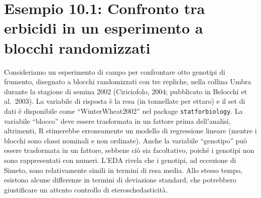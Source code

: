 \documentclass[
  12pt,
]{book}
\begin{document}
\hypertarget{esempio-10.1-confronto-tra-erbicidi-in-un-esperimento-a-blocchi-randomizzati}{%
\section{Esempio 10.1: Confronto tra erbicidi in un esperimento a blocchi randomizzati}\label{esempio-10.1-confronto-tra-erbicidi-in-un-esperimento-a-blocchi-randomizzati}}

Consideriamo un esperimento di campo per confrontare otto genotipi di frumento, disegnato a blocchi randomizzati con tre repliche, nella collina Umbra durante la stagione di semina 2002 (Ciriciofolo, 2004; pubblicato in Belocchi et al.~2003). La variabile di risposta è la resa (in tonnellate per ettaro) e il set di dati è disponibile come ``WinterWheat2002'' nel package \texttt{statforbiology}. La variabile ``blocco'' deve essere trasformata in un fattore prima dell'analisi, altrimenti, R stimerebbe erroneamente un modello di regressione lineare (mentre i blocchi sono classi nominali e non ordinate). Anche la variabile ``genotipo'' può essere trasformata in un fattore, sebbene ciò sia facoltativo, poiché i genotipi non sono rappresentati con numeri.
L'EDA rivela che i genotipi, ad eccezione di Simeto, sono relativamente simili in termini di resa media. Allo stesso tempo, esistono alcune differenze in termini di deviazione standard, che potrebbero giustificare un attento controllo di eteroschedasticità.
\end{document}
